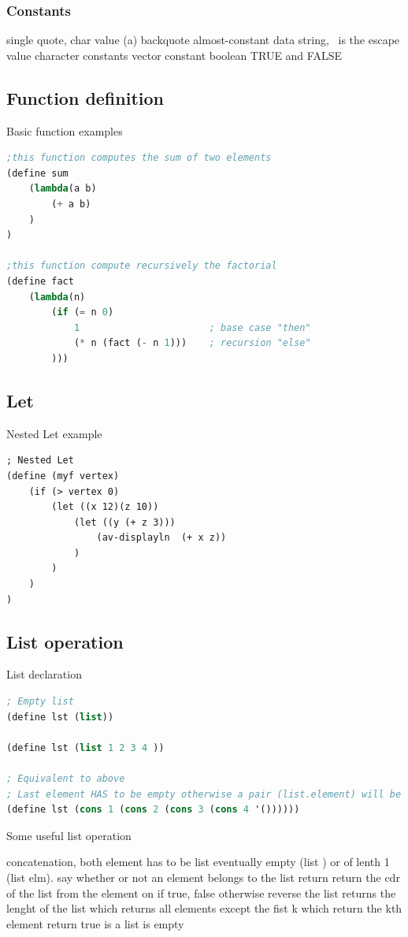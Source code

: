 \subsubsection{Constants}
	\begin{itemize}
		 single quote, char value (a)
		\itembf{} backquote almost-constant data
		 string, \ is the escape value
		\itembf{\#\textbackslash} character constants
		\itembf{\#()} vector constant
		 boolean TRUE and FALSE
	\end{itemize}
	
\subsection{Function definition}
Basic function examples
\begin{lstlisting}[language=lisp]
;this function computes the sum of two elements
(define sum
	(lambda(a b)
		(+ a b)
	)
)

;this function compute recursively the factorial
(define fact
	(lambda(n)
		(if (= n 0)
			1						; base case "then"
			(* n (fact (- n 1)))	; recursion "else"
		)))
\end{lstlisting}

\subsection{Let}
Nested Let example
\begin{lstlisting}
; Nested Let
(define (myf vertex)
	(if (> vertex 0)
		(let ((x 12)(z 10))
			(let ((y (+ z 3)))
				(av-displayln  (+ x z))		
			)
		)
	)
)
\end{lstlisting}

\newpage
\subsection{List operation}
List declaration
\begin{lstlisting}[language=lisp]
; Empty list
(define lst (list))

(define lst (list 1 2 3 4 ))

; Equivalent to above
; Last element HAS to be empty otherwise a pair (list.element) will be generated!
(define lst (cons 1 (cons 2 (cons 3 (cons 4 '())))))
\end{lstlisting}

Some useful list operation
\begin{itemize}
	 concatenation, both element has to be list eventually empty (list ) or of lenth 1 (list elm).
	 say whether or not an element belongs to the list return return the cdr of the list from the element on if true, false otherwise
	 reverse the list
	 returns the lenght of the list
	 which returns all elements except the fist k 
	 which return the kth element
	 return true is a list is empty
\end{itemize}

